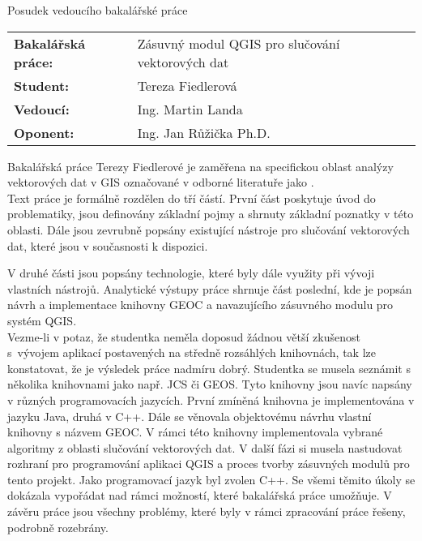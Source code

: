 \documentclass[czech,11pt,a4paper]{article}
\begin{document}
\begin{center}
  {\Large Posudek vedoucího bakalářské práce}
\end{center}

\vspace{.5cm}

\noindent \begin{tabular}{lp{}}
  {\bf Bakalářská práce:} &
  Zásuvný modul QGIS pro slučování vektorových dat \\
  {\bf Student:} & Tereza Fiedlerová \\
  {\bf Vedoucí:} & Ing. Martin Landa \\
  {\bf Oponent:} & Ing. Jan Růžička Ph.D. \\
\end{tabular}

\vspace{1cm}

Bakalářská práce Terezy Fiedlerové je zaměřena na specifickou oblast
analýzy vektorových dat v GIS označované v odborné literatuře jako
.
\\

Text práce je formálně rozdělen do tří částí. První část poskytuje
úvod do problematiky, jsou definovány základní pojmy a shrnuty
základní poznatky v této oblasti. Dále jsou zevrubně popsány
existující nástroje pro slučování vektorových dat, které jsou v
současnosti k dispozici.

V druhé části jsou popsány technologie, které byly dále využity při
vývoji vlastních nástrojů. Analytické výstupy práce shrnuje část
poslední, kde je popsán návrh a implementace knihovny GEOC a
navazujícího zásuvného modulu pro systém QGIS.
\\

Vezme-li v potaz, že studentka neměla doposud žádnou větší zkušenost
s~vývojem aplikací postavených na středně rozsáhlých knihovnách, tak
lze konstatovat, že je výsledek práce nadmíru dobrý. Studentka se
musela seznámit s několika knihovnami jako např. JCS či GEOS. Tyto
knihovny jsou navíc napsány v různých programovacích jazycích. První
zmíněná knihovna je implementována v jazyku Java, druhá v C++. Dále se
věnovala objektovému návrhu vlastní knihovny s názvem GEOC. V rámci
této knihovny implementovala vybrané algoritmy z oblasti slučování
vektorových dat. V další fázi si musela nastudovat rozhraní pro
programování aplikaci QGIS a proces tvorby zásuvných modulů pro tento
projekt. Jako programovací jazyk byl zvolen C++. Se všemi těmito úkoly
se dokázala vypořádat nad rámci možností, které bakalářská práce
umožňuje. V závěru práce jsou všechny problémy, které byly v rámci
zpracování práce řešeny, podrobně rozebrány.
\\
\end{document}
